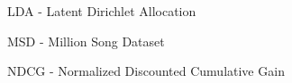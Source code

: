 LDA - Latent Dirichlet Allocation

MSD - Million Song Dataset

NDCG - Normalized Discounted Cumulative Gain